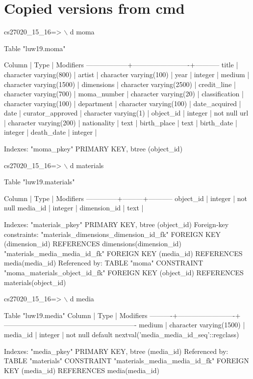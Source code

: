 \documentclass[journal,transmag]{IEEEtran}
\begin{document}
\clearpage
\newpage
\section {Copied versions from cmd}
\label{bad}

cs27020\_15\_16=> $\backslash$ d moma

Table "luw19.moma"

Column | Type | Modifiers
------------------+-------------------------+-----------
title | character varying(800) |
artist | character varying(100) |
year | integer |
medium | character varying(1500) |
dimensions | character varying(2500) |
credit\_line | character varying(700) |
moma\_number | character varying(20) |
classification | character varying(100) |
department | character varying(100) |
date\_acquired | date |
curator\_approved | character varying(1) |
object\_id | integer | not null
url | character varying(200) |
nationality | text |
birth\_place | text |
birth\_date | integer |
death\_date | integer |


Indexes:
"moma\_pkey" PRIMARY KEY, btree (object\_id)
\newline


cs27020\_15\_16=> $\backslash$ d materials

      Table "luw19.materials"

    Column    |  Type   | Modifiers
--------------+---------+-----------
 object\_id    | integer | not null
 media\_id     | integer |
 dimension\_id | text    |


Indexes:
    "materials\_pkey" PRIMARY KEY, btree (object\_id)
Foreign-key constraints:
    "materials\_dimensions\_dimension\_id\_fk" FOREIGN KEY (dimension\_id) REFERENCES dimensions(dimension\_id)
    "materials\_media\_media\_id\_fk" FOREIGN KEY (media\_id) REFERENCES media(media\_id)
Referenced by:
    TABLE "moma" CONSTRAINT "moma\_materials\_object\_id\_fk" FOREIGN KEY (object\_id) REFERENCES materials(object\_id)


cs27020\_15\_16=> $\backslash$ d media

                                      Table "luw19.media"
  Column  |          Type           |                        Modifiers          
----------+-------------------------+----------------------------------------------------------
 medium   | character varying(1500) |
 media\_id | integer                 | not null default nextval('media\_media\_id\_seq'::regclass)


Indexes:
    "media\_pkey" PRIMARY KEY, btree (media\_id)
Referenced by:
    TABLE "materials" CONSTRAINT "materials\_media\_media\_id\_fk" FOREIGN KEY (media\_id) REFERENCES media(media\_id)
\end{document}
